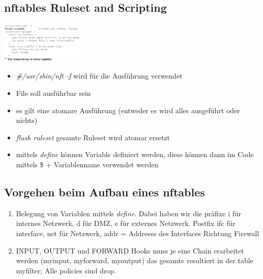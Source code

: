 \documentclass{report}
\newenvironment{Figure}
	{\par\medskip\noindent\minipage{\linewidth}}
	{\endminipage\par\medskip}
\theoremstyle{definition}
\theoremstyle{example}
\begin{document}
	\subsection{nftables Ruleset and Scripting}
\begin{Figure}
\centering
\includegraphics[width=150px]{img/nftablesRuleset.png}
	\label{fig:Beispielcode eines Rulesets}
\end{Figure}

\begin{itemize}
	\item \textit{\#\!/usr/sbin/nft -f} wird für die Ausführung verwendet
	\item File soll ausführbar sein
	\item es gilt eine atomare Ausführung (entweder es wird alles ausgeführt oder nichts)
	\item \textit{flush ruleset} gesamte Ruleset wird atomar ersetzt
	\item mittels \textit{define} können Variable definiert werden, diese können dann im Code mittels \$ + Variablenname verwendet werden
\end{itemize}

	\subsection{Vorgehen beim Aufbau eines nftables}
\begin{enumerate}
	\item Belegung von Variablen mittels \textit{define}. Dabei haben wir die präfixe i für internes Netzwerk, d für DMZ, e für externes Netzwerk. Postfix ifc für interface, net für Netzwerk, addr = Addreess des Interfaces Richtung Firewall
	\item INPUT, OUTPUT und FORWARD Hooks muss je eine Chain erarbeitet werden (myinput, myforward, myoutput) das gesamte resultiert in der table myfilter; Alle policies sind drop.
\end{enumerate}
\end{document}
